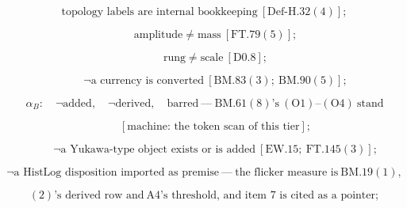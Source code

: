\documentclass[11pt,openany]{report}
\theoremstyle{canonplain}
\theoremstyle{canondef}
\begin{document}
\[
\text{topology labels are internal bookkeeping}\ [\mathrm{Def\text{-}H.32}(4)];
\]

\[
\qquad \text{amplitude}\ne\text{mass}\ [\mathrm{FT.79}(5)];
\]

\[
\qquad \text{rung}\ne\text{scale}\ [\mathrm{D0.8}];
\]

\[
\qquad \neg\text{a currency is converted}\ [\mathrm{BM.83}(3);\ \mathrm{BM.90}(5)];
\]

\[
\alpha_B:\quad\neg\text{added},\quad\neg\text{derived},\quad\text{barred}\ —\ \mathrm{BM.61}(8)\text{'s}\ (\mathrm O1)\text{--}(\mathrm O4)\ \text{stand}
\]

\[
\qquad [\text{machine: the token scan of this tier}];
\]

\[
\qquad \neg\text{a Yukawa-type object exists or is added}\ [\mathrm{EW.15};\ \mathrm{FT.145}(3)];
\]

\[
\neg\text{a HistLog disposition imported as premise}\ —\ \text{the flicker measure is}\ \mathrm{BM.19}(1),
\]

\[
(2)\text{'s derived row and}\ \mathrm{A4}\text{'s threshold, and item 7 is cited as a pointer};
\]
\end{document}
